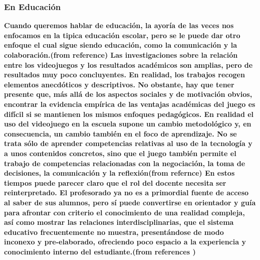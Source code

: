 \documentclass{bmcart}
\begin{document}
\subsubsection*{En Educación}
\textbf {Cuando queremos hablar de educación, la ayoría de las veces nos enfocamos en la tipica educación escolar, pero se le puede dar otro enfoque el cual sigue siendo educación, como la comunicación y la colaboración.(from reference\cite{sanchez2008videojuegos})
\newline
Las investigaciones sobre la relación entre los videojuegos y los resultados académicos son amplias, pero de resultados muy poco concluyentes. En realidad, los trabajos recogen elementos anecdóticos y descriptivos. No obstante, hay que tener presente que, más allá de los aspectos sociales y de motivación obvios, encontrar la evidencia empírica de las ventajas académicas del juego es difícil si se mantienen los mismos enfoques pedagógicos. En realidad el uso del videojuego en la escuela supone un cambio metodológico y, en consecuencia, un cambio también en el foco de aprendizaje. No se trata sólo de aprender competencias relativas al uso de la tecnología y a unos contenidos concretos, sino que el juego también permite el trabajo de competencias relacionadas con la negociación, la toma de decisiones, la comunicación y la reflexión(from refernce\cite{salvat2008videojuegos})
\newline
\newline
En estos tiempos puede parecer claro que el rol del docente necesita ser reinterpretado. El profesorado ya no es a primordial fuente de acceso al saber de sus alumnos, pero sí puede convertirse en orientador y guía para afrontar con criterio el conocimiento de una realidad compleja, así como mostrar las relaciones interdisciplinarias, que el sistema educativo frecuentemente no muestra, presentándose de modo inconexo y pre-elaborado, ofreciendo poco espacio a la experiencia y conocimiento interno del estudiante.(from references\cite{ruiz2012aprendiendo} \cite{pascual2010aprendiendo})
\newline
}
\end{document}
